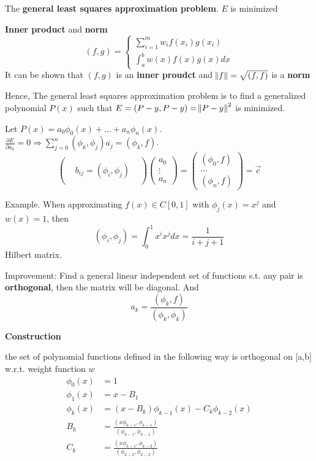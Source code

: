 \documentclass[11pt]{article}
\begin{document}
The \textbf{general least squares approximation problem}. \(E\) is minimized


\textbf{Inner product} and \textbf{norm}
\begin{equation*}
(f,g)=
\begin{cases}
\displaystyle\sum_{i=1}^m w_if(x_i)g(x_i)\\
\int_a^bw(x)f(x)g(x)dx
\end{cases}
\end{equation*}
It can be shown that \((f,g)\) is an \textbf{inner proudct} and \(\norm{f}=\sqrt{(f,f)}\)
is a \textbf{norm}


Hence, The general least squares approximation problem is to find a
generalized polynomial \(P(x)\) such that \(E=(P-y,P-y)=\norm{P-y}^2\) is
minimized. 


Let \(P(x)=a_0\phi_0(x)+\dots+a_n\phi_n(x)\). 
\(\frac{\partial E}{\partial a_k}=0\Longrightarrow
   \displaystyle\sum_{j=0}^n(\phi_k,\phi_j)a_j=(\phi_k,f)\).
\begin{equation*}
\begin{pmatrix}
&&\\
&b_{ij}=(\phi_i,\phi_j)&\\
&&
\end{pmatrix}
\begin{pmatrix}
a_0\\
\vdots\\
a_n
\end{pmatrix}
=
\begin{pmatrix}
(\phi_0,f)\\
\dots\\
(\phi_n,f)
\end{pmatrix}=\vec{c}
\end{equation*}


Example. When approximating \(f(x)\in C[0,1]\) with \(\phi_j(x)=x^j\) and
\(w(x)=1\), then
\begin{equation*}
(\phi_i,\phi_j)=\int_0^1x^ix^jdx=\frac{1}{i+j+1}
\end{equation*}
Hilbert matrix.


Improvement: Find a general linear independent set of functions s.t. any pair
is \textbf{orthogonal}, then the matrix will be diagonal. And
\begin{equation*}
a_k=\frac{(\phi_k,f)}{(\phi_k,\phi_k)}
\end{equation*}


\textbf{Construction}
\begin{theorem}
the set of polynomial functions defined in the following way is orthogonal on [a,b]
w.r.t. weight function $w$
\begin{align*}
\phi_0(x)&=1\\
\phi_1(x)&=x-B_1\\
\phi_k(x)&=(x-B_k)\phi_{k-1}(x)-C_k\phi_{k-2}(x)\\
B_k&=\frac{(x\phi_{k-1},\phi_{k-1})}{(\phi_{k-1},\phi_{k-1})}\\
C_k&=\frac{(x\phi_{k-1},\phi_{k-2})}{(\phi_{k-2},\phi_{k-2})}
\end{align*}
\end{theorem}
\end{document}

